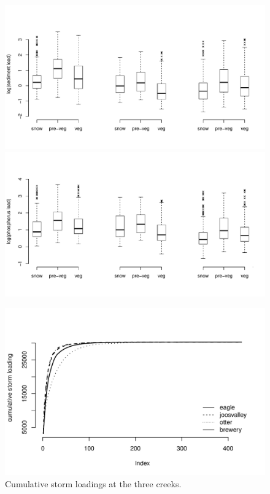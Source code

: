 \documentclass[12pt]{article}
\begin{document}
\begin{figure}[h]
    \begin{center}
\includegraphics{loadings-boxplot_stot}
\includegraphics{loadings-boxplot_ptot}
    \end{center}
\end{figure}










\begin{figure}
    \begin{center}
\includegraphics{loadings-figure1}
    \end{center}
    \caption{Cumulative storm loadings at the three creeks.\label{cdf}}
\end{figure}
\end{document}

